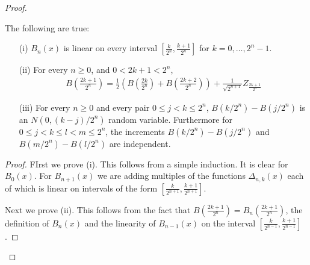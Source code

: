 \begin{proof}
\begin{lem}The following are true:
\begin{itemize}
\item[(i)] $B_n(x)$ is linear on every interval $[\frac{k}{2^n},
\frac{k+1}{2^n}]$ for $k=0,\dots,2^n -1$.
\item[(ii)]For every $n \geq 0$, and $0 < 2k+1 < 2^n$, 
\begin{align*}
B(\frac{2k+1}{2^n}) = \frac{1}{2} (B(\frac{2k}{2^n}) +
B(\frac{2k+2}{2^n})) + \frac{1}{\sqrt{2^{n+1}}} Z_{\frac{2k+1}{2^n}}
\end{align*}
\item[(iii)]For every $n \geq 0$ and every pair $0 \leq j < k \leq 2^n$,
$B(k/2^n) - B(j/2^n)$ is an $N(0, (k-j)/2^n)$ random variable.
Furthermore for $0 \leq j < k \leq l < m \leq 2^n$, the increments
$B(k/2^n) - B(j/2^n)$ and $B(m/2^n) - B(l/2^n)$ are independent.
\end{itemize}
\end{lem}
\begin{proof}
FIrst we prove (i).  This follows from a simple induction.  It is clear for $B_0(x)$.  For
$B_{n+1}(x)$ we are adding multiples of the functions $\Delta_{n,k}(x)$ each of which is linear on intervals of the form $[\frac{k}{2^{n+1}},
\frac{k+1}{2^{n+1}}]$.

Next we prove (ii).  This follows from the fact that
$B(\frac{2k+1}{2^n})=B_n(\frac{2k+1}{2^n})$, the definition of
$B_n(x)$ and the linearity of $B_{n-1}(x)$ on the interval
$[\frac{k}{2^{n-1}}, \frac{k+1}{2^{n-1}}]$.


\end{proof}
\end{proof}
